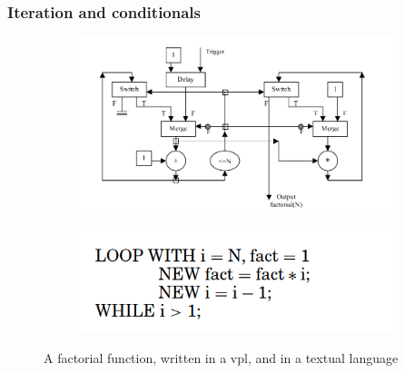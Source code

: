 


\subsubsection*{Iteration and conditionals}

\begin{figure}
  \centering
  \begin{subfigure}[b]{0.45\linewidth}
    \graphicspath{{../../assets/images/background/vpl/}}
    \centering
    \includegraphics[width=\linewidth]{iteration-vpl.png}
    \caption{}\label{fig:vpl-iteration:1}
  \end{subfigure}%
  \qquad %
  \begin{subfigure}[b]{0.45\linewidth}
    \graphicspath{{../../assets/images/background/vpl/}}
    \centering
    \includegraphics[width=\linewidth]{iteration-text.png}
    \caption{}\label{fig:vpl-iteration:2}
  \end{subfigure}%
  \caption[Comparison of iteration]{A factorial function, written in a vpl, and in a textual language \citep{sousa_dataflow_2012}}%
  \label{fig:vpl-iteration}
\end{figure}

